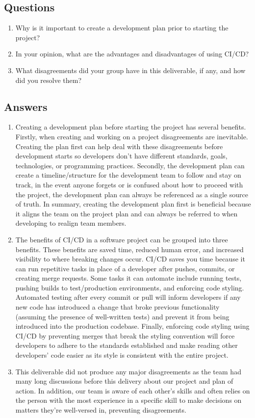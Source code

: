 \documentclass[12pt, titlepage]{article}
\begin{document}
\subsection*{Questions}
\begin{enumerate}
    \item Why is it important to create a development plan prior to starting the
    project?
    \item In your opinion, what are the advantages and disadvantages of using
    CI/CD?
    \item What disagreements did your group have in this deliverable, if any,
    and how did you resolve them?
\end{enumerate}
\subsection*{Answers}
\begin{enumerate}
    \item Creating a development plan before starting the project has several benefits. Firstly, when creating and working on a project disagreements are inevitable. Creating the plan first can help deal with these disagreements before development starts so developers don’t have different standards, goals, technologies, or programming practices. Secondly, the development plan can create a timeline/structure for the development team to follow and stay on track, in the event anyone forgets or is confused about how to proceed with the project, the development plan can always be referenced as a single source of truth. In summary, creating the development plan first is beneficial because it aligns the team on the project plan and can always be referred to when developing to realign team members.
    \item The benefits of CI/CD in a software project can be grouped into three benefits. These benefits are saved time, reduced human error, and increased visibility to where breaking changes occur. CI/CD saves you time because it can run repetitive tasks in place of a developer after pushes, commits, or creating merge requests. Some tasks it can automate include running tests, pushing builds to test/production environments, and enforcing code styling. Automated testing after every commit or pull will inform developers if any new code has introduced a change that broke previous functionality (assuming the presence of well-written tests) and prevent it from being introduced into the production codebase. Finally, enforcing code styling using CI/CD by preventing merges that break the styling convention will force developers to adhere to the standards established and make reading other developers' code easier as its style is consistent with the entire project.
    \item This deliverable did not produce any major disagreements as the team had many long discussions before this delivery about our project and plan of action. In addition, our team is aware of each other's skills and often relies on the person with the most experience in a specific skill to make decisions on matters they're well-versed in, preventing disagreements.
\end{enumerate}
\newpage{}
\end{document}
